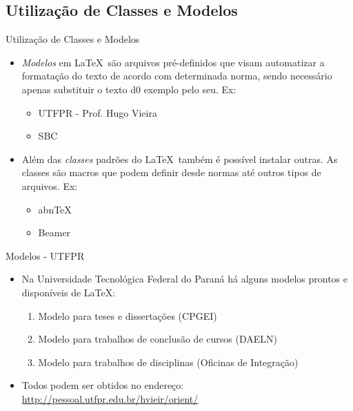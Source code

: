 \subsection{Utilização de Classes e Modelos}
\begin{frame}{Utilização de Classes e Modelos}

  \begin{itemize}
    \item \textit{Modelos} em \LaTeX\ são arquivos pré-definidos que visam automatizar a formatação do texto de acordo com determinada norma, sendo necessário apenas substituir o texto d0 exemplo pelo seu. Ex:
    \begin{itemize}
    \item UTFPR - Prof. Hugo Vieira
    \item SBC
    \end{itemize}

    \vspace{0.5cm}
    
    \item Além das \textit{classes} padrões do \LaTeX\ também é possível instalar outras. As classes são macros que podem definir desde normas até outros tipos de arquivos. Ex:
    \begin{itemize}
    \item abn\TeX
    \item Beamer
    \end{itemize}
    
    \end{itemize}
\end{frame}

\begin{frame}{Modelos - UTFPR}
 
    \begin{itemize}
    \item Na Universidade Tecnológica Federal do Paraná há alguns modelos prontos e disponíveis de \LaTeX:
        \begin{enumerate}
        \item Modelo para teses e dissertações (CPGEI) 
        \item Modelo para trabalhos de conclusão de cursos (DAELN) 
        \item Modelo para trabalhos de disciplinas (Oficinas de Integração) 
        \end{enumerate}
    \item Todos podem ser obtidos no endereço: \url{http://pessoal.utfpr.edu.br/hvieir/orient/}
    \end{itemize}

\end{frame}

